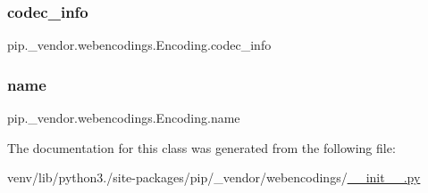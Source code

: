 \subsubsection{\texorpdfstring{codec\+\_\+info}{codec\_info}}
{\footnotesize\ttfamily pip.\+\_\+vendor.\+webencodings.\+Encoding.\+codec\+\_\+info}

\mbox{\label{classpip_1_1__vendor_1_1webencodings_1_1Encoding_a1fbc38c589878156cf9524fe640c1787}} 
\subsubsection{\texorpdfstring{name}{name}}
{\footnotesize\ttfamily pip.\+\_\+vendor.\+webencodings.\+Encoding.\+name}



The documentation for this class was generated from the following file\+:\begin{DoxyCompactItemize}
\item 
venv/lib/python3./site-\/packages/pip/\+\_\+vendor/webencodings/\hyperlink{venv_2lib_2python3_89_2site-packages_2pip_2__vendor_2webencodings_2____init_____8py}{\+\_\+\+\_\+init\+\_\+\+\_\+.\+py}\end{DoxyCompactItemize}
